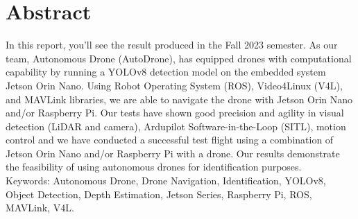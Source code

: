 \section*{Abstract}
In this report, you'll see the result produced in the Fall 2023 semester. As our team, Autonomous Drone (AutoDrone), has equipped drones with computational capability by running a YOLOv8 detection model on the embedded system Jetson Orin Nano. Using Robot Operating System (ROS), Video4Linux (V4L), and MAVLink libraries, we are able to navigate the drone with Jetson Orin Nano and/or Raspberry Pi. Our tests have shown good precision and agility in visual detection (LiDAR and camera), Ardupilot Software-in-the-Loop (SITL), motion control and we have conducted a successful test flight using a combination of Jetson Orin Nano and/or Raspberry Pi with a drone. Our results demonstrate the feasibility of using autonomous drones for identification purposes. \\

Keywords: Autonomous Drone, Drone Navigation, Identification, YOLOv8, Object Detection, Depth Estimation, Jetson Series, Raspberry Pi, ROS, MAVLink, V4L.
